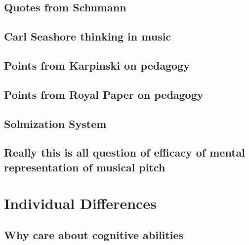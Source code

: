 \documentclass[]{book}
\theoremstyle{definition}
\theoremstyle{definition}
\theoremstyle{definition}
\theoremstyle{remark}
\begin{document}
\hypertarget{quotes-from-schumann}{%
\section{Quotes from Schumann}\label{quotes-from-schumann}}

\hypertarget{carl-seashore-thinking-in-music}{%
\section{Carl Seashore thinking in
music}\label{carl-seashore-thinking-in-music}}

\hypertarget{points-from-karpinski-on-pedagogy}{%
\section{Points from Karpinski on
pedagogy}\label{points-from-karpinski-on-pedagogy}}

\hypertarget{points-from-royal-paper-on-pedagogy}{%
\section{Points from Royal Paper on
pedagogy}\label{points-from-royal-paper-on-pedagogy}}

\hypertarget{solmization-system}{%
\section{Solmization System}\label{solmization-system}}

\hypertarget{really-this-is-all-question-of-efficacy-of-mental-representation-of-musical-pitch}{%
\section{Really this is all question of efficacy of mental
representation of musical
pitch}\label{really-this-is-all-question-of-efficacy-of-mental-representation-of-musical-pitch}}

\hypertarget{individual-differences}{%
\chapter{Individual Differences}\label{individual-differences}}

\hypertarget{why-care-about-cognitive-abilities}{%
\section{Why care about cognitive
abilities}\label{why-care-about-cognitive-abilities}}
\end{document}

